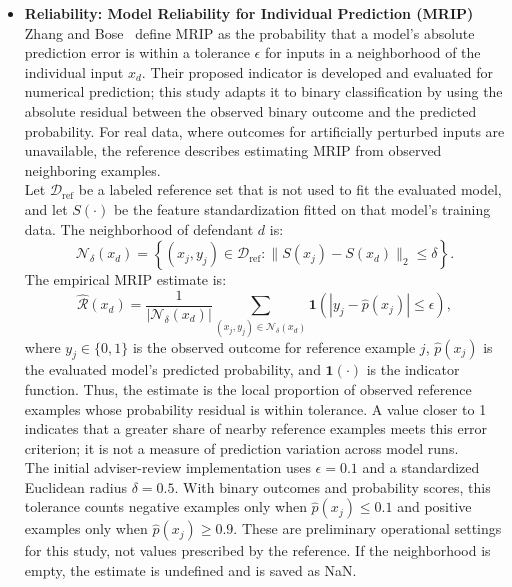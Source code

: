\documentclass[12pt]{article}
\begin{document}
\begin{itemize}
  \item \textbf{Reliability: Model Reliability for Individual Prediction (MRIP)}\\
  \tabto{2em} Zhang and Bose~\cite{zhang2024reliability} define MRIP as the probability that a model's absolute prediction error is within a tolerance $\epsilon$ for inputs in a neighborhood of the individual input $x_d$. Their proposed indicator is developed and evaluated for numerical prediction; this study adapts it to binary classification by using the absolute residual between the observed binary outcome and the predicted probability. For real data, where outcomes for artificially perturbed inputs are unavailable, the reference describes estimating MRIP from observed neighboring examples.\\

  Let $\mathcal{D}_{\mathrm{ref}}$ be a labeled reference set that is not used to fit the evaluated model, and let $S(\cdot)$ be the feature standardization fitted on that model's training data. The neighborhood of defendant $d$ is:
  \[
  \mathcal{N}_{\delta}(x_d) = \left\{(x_j,y_j) \in \mathcal{D}_{\mathrm{ref}} : \|S(x_j)-S(x_d)\|_2 \leq \delta \right\}.
  \]
  The empirical MRIP estimate is:
  \[
  \widehat{\mathcal{R}}(x_d) = \frac{1}{|\mathcal{N}_{\delta}(x_d)|}
  \sum_{(x_j,y_j) \in \mathcal{N}_{\delta}(x_d)}
  \mathbf{1}\left(\left|y_j-\hat{p}(x_j)\right| \leq \epsilon\right),
  \]
  where $y_j \in \{0,1\}$ is the observed outcome for reference example $j$, $\hat{p}(x_j)$ is the evaluated model's predicted probability, and $\mathbf{1}(\cdot)$ is the indicator function. Thus, the estimate is the local proportion of observed reference examples whose probability residual is within tolerance. A value closer to 1 indicates that a greater share of nearby reference examples meets this error criterion; it is not a measure of prediction variation across model runs.\\

  The initial adviser-review implementation uses $\epsilon=0.1$ and a standardized Euclidean radius $\delta=0.5$. With binary outcomes and probability scores, this tolerance counts negative examples only when $\hat{p}(x_j) \leq 0.1$ and positive examples only when $\hat{p}(x_j) \geq 0.9$. These are preliminary operational settings for this study, not values prescribed by the reference. If the neighborhood is empty, the estimate is undefined and is saved as NaN.\\


\end{itemize}
\end{document}
